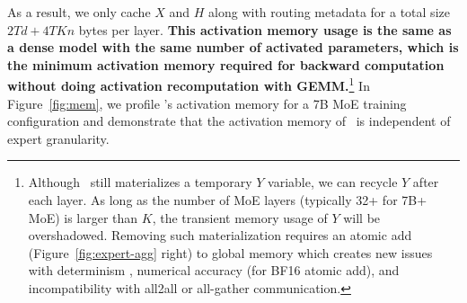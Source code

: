 As a result, we only cache $X$ and $H$ along with routing metadata for a total size $2 T d + 4 T K n$ bytes per layer. \textbf{This activation memory usage is the same as a dense model with the same number of activated parameters, which is the minimum activation memory required for backward computation without doing activation recomputation with GEMM.}\footnote{Although \Algname~still materializes a temporary $Y$ variable, we can recycle $Y$ after each layer. As long as the number of MoE layers (typically 32+ for 7B+ MoE) is larger than $K$,  the transient memory usage of $Y$ will be overshadowed. Removing such materialization requires an atomic add (Figure~\ref{fig:expert-agg} right) to global memory which creates new issues with determinism \citep{determinism}, numerical accuracy (for BF16 atomic add), and incompatibility with all2all or all-gather communication.} In Figure~\ref{fig:mem}, we profile \Algname's activation memory for a 7B MoE training configuration and demonstrate that the activation memory of \Algname~is independent of expert granularity.




 






